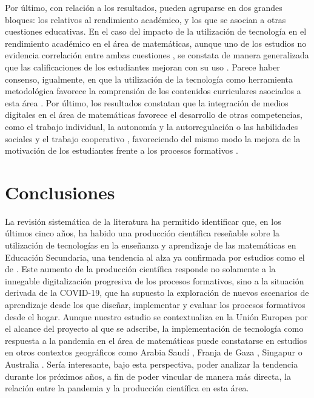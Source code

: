 \documentclass[spanish]{textolivre}
\begin{document}
Por último, con relación a los resultados, pueden agruparse en dos grandes bloques: los relativos al rendimiento académico, y los que se asocian a otras cuestiones educativas. En el caso del impacto de la utilización de tecnología en el rendimiento académico en el área de matemáticas, aunque uno de los estudios no evidencia correlación entre ambas cuestiones \cite{del_cerro_application_2021}, se constata de manera generalizada que las calificaciones de los estudiantes mejoran con su uso \cite{benitez__effects_2019,gil-quintana_learning_2020,garcia-martin_use_2019,gomez-garcia_technological_2020,hossein-mohand_uses_2021}. Parece haber consenso, igualmente, en que la utilización de la tecnología como herramienta metodológica favorece la comprensión de los contenidos curriculares asociados a esta área \cite{beltran_modelado_2017,jesionkowska_active_2020,jimenez_digital_2020,petrov_effect_2020}. Por último, los resultados constatan que la integración de medios digitales en el área de matemáticas favorece el desarrollo de otras competencias, como el trabajo individual, la autonomía y la autorregulación \cite{curto__student_2019,weinhandl_look_2021} o las habilidades sociales y el trabajo cooperativo \cite{altanis_systematic_2018,iglesias_aprendizaje_2020,weinhandl_real-world_2021}, favoreciendo del mismo modo la mejora de la motivación de los estudiantes frente a los procesos formativos \cite{aris_educational_2019,lopez_formative_2019,silva-diaz_uso_2021}.

\section{Conclusiones}

La revisión sistemática de la literatura ha permitido identificar que, en los últimos cinco años, ha habido una producción científica reseñable sobre la utilización de tecnologías en la enseñanza y aprendizaje de las matemáticas en Educación Secundaria, una tendencia al alza ya confirmada por estudios como el de \textcite{hillmayr_potential_2020}. Este aumento de la producción científica responde no solamente a la innegable digitalización progresiva de los procesos formativos, sino a la situación derivada de la COVID-19, que ha supuesto la exploración de nuevos escenarios de aprendizaje desde los que diseñar, implementar y evaluar los procesos formativos desde el hogar. Aunque nuestro estudio se contextualiza en la Unión Europea por el alcance del proyecto al que se adscribe, la implementación de tecnología como respuesta a la pandemia en el área de matemáticas puede constatarse en estudios en otros contextos geográficos como Arabia Saudí \cite{alabdulaziz_covid-19_2021}, Franja de Gaza \cite{marban_primary_2021}, Singapur \cite{tay_implementation_2021} o Australia \cite{attard_exploration_2020}. Sería interesante, bajo esta perspectiva, poder analizar la tendencia durante los próximos años, a fin de poder vincular de manera más directa, la relación entre la pandemia y la producción científica en esta área.
\end{document}
